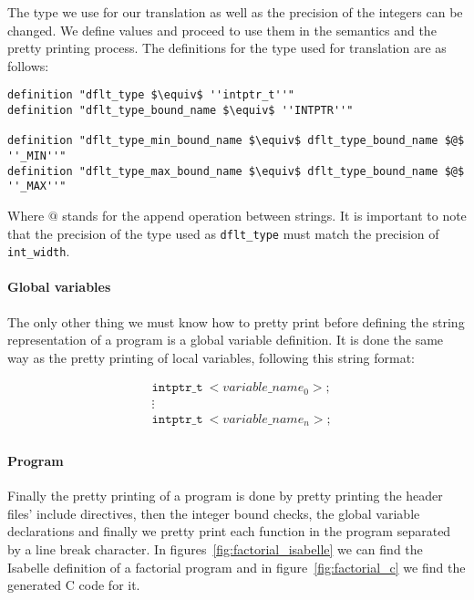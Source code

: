 The type we use for our translation as well as the precision of the integers can be changed.
We define values and proceed to use them in the semantics and the pretty printing process.
The definitions for the type used for translation are as follows:

\begin{lstlisting}[frame=single, mathescape=true]
definition "dflt_type $\equiv$ ''intptr_t''"
definition "dflt_type_bound_name $\equiv$ ''INTPTR''"

definition "dflt_type_min_bound_name $\equiv$ dflt_type_bound_name $@$ ''_MIN''"
definition "dflt_type_max_bound_name $\equiv$ dflt_type_bound_name $@$ ''_MAX''"
\end{lstlisting}

Where $@$ stands for the append operation between strings.
It is important to note that the precision of the type used as \verb|dflt_type| must match the precision of \verb|int_width|.

\paragraph{Global variables}

The only other thing we must know how to pretty print before defining the string representation of a program is a global variable definition.
It is done the same way as the pretty printing of local variables, following this string format:

\begin{equation*}
\begin{split}
& \mathtt{intptr\_t}\ <variable\_name_0>; \\
& \vdots \\
& \mathtt{intptr\_t}\ <variable\_name_n>; \\
\end{split}
\end{equation*}

\paragraph{Program}

Finally the pretty printing of a program is done by pretty printing the header files' include directives, then the integer bound checks, the global variable declarations and finally we pretty print each function in the program separated by a line break character.
In figures~\ref{fig:factorial_isabelle} we can find the Isabelle definition of a factorial program and in figure~\ref{fig:factorial_c} we find the generated C code for it.

